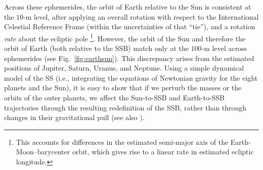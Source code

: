 \documentclass[iop,apj,twocolappendix]{emulateapj}
\begin{document}
Across these ephemerides, the orbit of Earth relative to the Sun is consistent at the $10$-m level, after applying an overall rotation with respect to the International Celestial Reference Frame (within the uncertainties of that ``tie''), and a rotation \emph{rate} about the ecliptic pole \footnote{\label{footnote:rate}This accounts for differences in the estimated semi-major axis of the Earth-Moon--barycenter orbit, which gives rise to a linear rate in estimated ecliptic longitude.}.
However, the orbit of the Sun and therefore the orbit of Earth (both relative to the SSB) match only at the $100$-m level across ephemerides (see Fig.\ \ref{fig:earthsun}). This discrepancy arises from the estimated positions of Jupiter, Saturn, Uranus, and Neptune. Using a simple dynamical model of the SS (i.e., integrating the equations of Newtonian gravity for the eight planets and the Sun), it is easy to show that if we perturb the masses or the orbits of the outer planets, we affect the Sun-to-SSB and Earth-to-SSB trajectories through the resulting redefinition of the SSB, rather than through changes in their gravitational pull (see also \citealt{2019MNRAS.489.5573G}).
%
\end{document}
